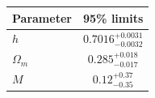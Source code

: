 \begin{tabular} { l  c}

 Parameter &  95\% limits\\
\hline
{\boldmath$h              $} & $0.7016^{+0.0031}_{-0.0032}$\\

{\boldmath$Ω_m            $} & $0.285^{+0.018}_{-0.017}   $\\

{\boldmath$M              $} & $0.12^{+0.37}_{-0.35}      $\\
\hline
\end{tabular}